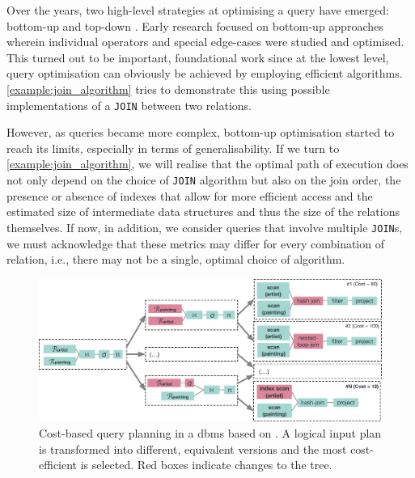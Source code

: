 Over the years, two high-level strategies at optimising a query have emerged: bottom-up and top-down \cite{Jarke:1984Query}. Early research focused on bottom-up approaches wherein individual operators and special edge-cases were studied and optimised. This turned out to be important, foundational work since at the lowest level, query optimisation can obviously be achieved by employing efficient algorithms. \cref{example:join_algorithm} tries to demonstrate this using possible implementations of a \texttt{JOIN} between two relations.

However, as queries became more complex, bottom-up optimisation started to reach its limits, especially in terms of generalisability. If we turn to \cref{example:join_algorithm}, we will realise that the optimal path of execution does not only depend on the choice of \texttt{JOIN} algorithm but also on the join order, the presence or absence of indexes that allow for more efficient access and the estimated size of intermediate data structures and thus the size of the relations themselves. If now, in addition, we consider queries that involve multiple \texttt{JOIN}s, we must acknowledge that these metrics may differ for every combination of relation, i.e., there may not be a single, optimal choice of algorithm. 

\begin{figure}[tb]
    \centering
    \includegraphics[width=\textwidth]{figures/query-planning.eps}
    \caption{Cost-based query planning in a \acrshort{dbms} based on . A logical input plan is transformed into different, equivalent versions and the most cost-efficient is selected. Red boxes indicate changes to the tree.}
    \label{figure:query_planning}
\end{figure}

